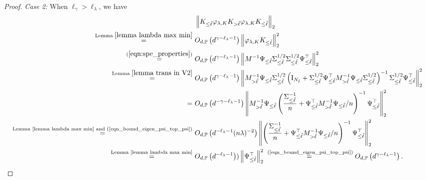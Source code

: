 \documentclass{article}
\theoremstyle{plain}
\theoremstyle{definition}
\theoremstyle{remark}
\begin{document}
\begin{appendix}
\begin{proof}
\textit{Case 2:} When $\ell_{\gamma} > \ell_{\lambda}$, we have
    \begin{align*}
        &~\left\| K_{\leq \tilde{\ell}} \varphi_{\lambda, K} K_{> \tilde{\ell}}  \varphi_{\lambda, K} K_{\leq \tilde{\ell}}\right\|_{2}\\
        \overset{\text{Lemma } \ref{lemma lambda max min}}{=} &~O_{d, \mathbb{P}}\left({d^{\gamma-\ell_{\lambda}-1}}\right) \left\|  \varphi_{\lambda, K} K_{\leq \tilde{\ell}}\right\|_{2}^{2}\\
        \overset{(\ref{eqn:spe_properties})}{=}
        &~
        O_{d, \mathbb{P}}\left({d^{\gamma-\ell_{\lambda}-1}}\right) \left\|  M^{-1} \Psi_{\leq \tilde{\ell}} \Sigma_{\leq \tilde{\ell}}^{1/2} \Sigma_{\leq \tilde{\ell}}^{1/2} \Psi_{\leq \tilde{\ell}}^{\top} \right\|_{2}^{2}
        \\
        \overset{\text{Lemma } \ref{lemma trans in V2}}{=}
        &~
        O_{d, \mathbb{P}}\left({d^{\gamma-\ell_{\lambda}-1}}\right) \left\|M_{>\tilde{\ell}}^{-1} \Psi_{\leq \tilde{\ell}} \Sigma_{\leq \tilde{\ell}}^{1/2} \left( \mathrm{I}_{N_{\tilde{\ell}}} +  \Sigma_{\leq \tilde{\ell}}^{1/2}  \Psi_{\leq \tilde{\ell}}^{\top} M_{>\tilde{\ell}}^{-1} \Psi_{\leq \tilde{\ell}} \Sigma_{\leq \tilde{\ell}}^{1/2}\right)^{-1} \Sigma_{\leq \tilde{\ell}}^{1/2} \Psi_{\leq \tilde{\ell}}^{\top}\right\|_{2}^{2}\\
        =&~
        O_{d, \mathbb{P}}\left({d^{-\gamma-\ell_{\lambda}-1}}\right) \left\|M_{>\tilde{\ell}}^{-1} \Psi_{\leq \tilde{\ell}}  \left( \frac{\Sigma_{\leq \tilde{\ell}}^{-1}}{n} +  \Psi_{\leq \tilde{\ell}}^{\top} M_{>\tilde{\ell}}^{-1} \Psi_{\leq \tilde{\ell}} /n \right)^{-1} \Psi_{\leq \tilde{\ell}}^{\top}\right\|_{2}^{2}\\
        \overset{\text{Lemma \ref{lemma lambda max min} and (\ref{eqn_bound_eigen_psi_top_psi})}}{=}
        &~
        O_{d, \mathbb{P}}\left({d^{-\ell_{\lambda}-1}} (n\lambda)^{-2}\right) \left\|  \left( \frac{\Sigma_{\leq \tilde{\ell}}^{-1}}{n} +  \Psi_{\leq \tilde{\ell}}^{\top} M_{>\tilde{\ell}}^{-1} \Psi_{\leq \tilde{\ell}} /n \right)^{-1} \Psi_{\leq \tilde{\ell}}^{\top}\right\|_{2}^{2}\\
        \overset{\text{Lemma \ref{lemma lambda max min}}}{=}
        &~
         O_{d, \mathbb{P}}\left({d^{-\ell_{\lambda}-1}}\right)) \left\|  \Psi_{\leq \tilde{\ell}}^{\top}\right\|_{2}^{2} \overset{\text{ (\ref{eqn_bound_eigen_psi_top_psi})}}{=}  O_{d, \mathbb{P}}\left({d^{\gamma-\ell_{\lambda}-1}}\right).
    \end{align*}



\end{proof}
\end{appendix}
\end{document}
